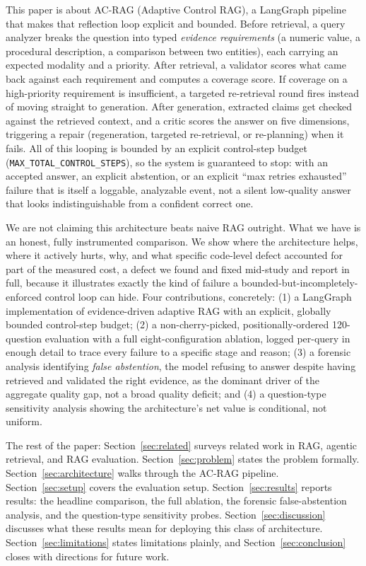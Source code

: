 \documentclass[conference]{IEEEtran}
\begin{document}
This paper is about AC-RAG (Adaptive Control RAG), a LangGraph pipeline that makes
that reflection loop explicit and bounded. Before retrieval, a query analyzer breaks
the question into typed \emph{evidence requirements} (a numeric value, a procedural
description, a comparison between two entities), each carrying an expected modality
and a priority. After retrieval, a validator scores what came back against each
requirement and computes a coverage score. If coverage on a high-priority requirement
is insufficient, a targeted re-retrieval round fires instead of moving straight to
generation. After generation, extracted claims get checked against the retrieved
context, and a critic scores the answer on five dimensions, triggering a repair
(regeneration, targeted re-retrieval, or re-planning) when it fails. All of this
looping is bounded by an explicit control-step budget
(\texttt{MAX\_TOTAL\_CONTROL\_STEPS}), so the system is guaranteed to stop: with an
accepted answer, an explicit abstention, or an explicit ``max retries exhausted''
failure that is itself a loggable, analyzable event, not a silent low-quality answer
that looks indistinguishable from a confident correct one.

We are not claiming this architecture beats naive RAG outright. What we have is an
honest, fully instrumented comparison. We show where the architecture helps, where it
actively hurts, why, and what specific code-level defect accounted for part of the
measured cost, a defect we found and fixed mid-study and report in full, because it
illustrates exactly the kind of failure a bounded-but-incompletely-enforced control
loop can hide. Four contributions, concretely: (1) a LangGraph implementation of
evidence-driven adaptive RAG with an explicit, globally bounded control-step budget;
(2) a non-cherry-picked, positionally-ordered 120-question evaluation with a full
eight-configuration ablation, logged per-query in enough detail to trace every failure
to a specific stage and reason; (3) a forensic analysis identifying \emph{false
abstention}, the model refusing to answer despite having retrieved and validated the
right evidence, as the dominant driver of the aggregate quality gap, not a broad
quality deficit; and (4) a question-type sensitivity analysis showing the
architecture's net value is conditional, not uniform.

The rest of the paper: Section~\ref{sec:related} surveys related work in RAG, agentic
retrieval, and RAG evaluation. Section~\ref{sec:problem} states the problem formally.
Section~\ref{sec:architecture} walks through the AC-RAG pipeline. Section~\ref{sec:setup}
covers the evaluation setup. Section~\ref{sec:results} reports results: the headline
comparison, the full ablation, the forensic false-abstention analysis, and the
question-type sensitivity probes. Section~\ref{sec:discussion} discusses what these
results mean for deploying this class of architecture. Section~\ref{sec:limitations}
states limitations plainly, and Section~\ref{sec:conclusion} closes with directions
for future work.
\end{document}

